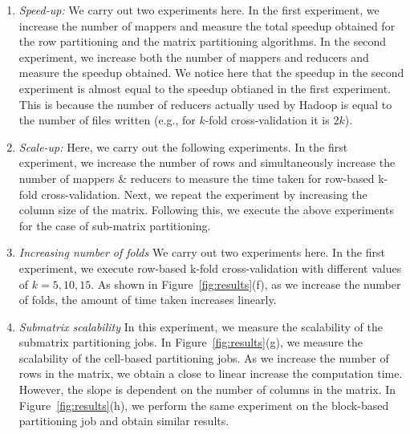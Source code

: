 \documentclass{vldb}
\begin{document}
\begin{enumerate}
\item {\em Speed-up:} We carry out two experiments here. In the first
experiment, we increase the number of mappers and measure the total speedup
obtained for the row partitioning and the matrix partitioning algorithms. In the
second experiment, we increase both the number of mappers and reducers and
measure the speedup obtained. We notice here that the speedup in the second
experiment is almost equal to the speedup obtianed in the first experiment. This
is because the number of reducers actually used by Hadoop is equal to the number
of files written (e.g., for $k$-fold cross-validation it is $2k$).

\item {\em Scale-up:} Here, we carry out the following experiments. In the first
experiment, we increase the number of rows and simultaneously increase the
number of mappers \& reducers to measure the time taken for row-based k-fold
cross-validation. Next, we repeat the experiment by increasing the column size
of the matrix. Following this, we execute the above experiments for the case of
sub-matrix partitioning.

\item {\em Increasing number of folds} We carry out two experiments here. In the
first experiment, we execute row-based k-fold cross-validation with different values of
$k = 5, 10, 15$. As shown in Figure~\ref{fig:results}(f), as we increase the
number of folds, the amount of time taken increases linearly.

\item {\em Submatrix scalability} In this experiment, we measure the scalability
of the submatrix partitioning jobs. In Figure~\ref{fig:results}(g), we measure
the scalability of the cell-based partitioning jobs. As we increase the number
of rows in the matrix, we obtain a close to linear increase the computation
time. However, the slope is dependent on the number of columns in the matrix. In
Figure~\ref{fig:results}(h), we perform the same experiment on the block-based
partitioning job and obtain similar results.
\end{enumerate}
\end{document}
